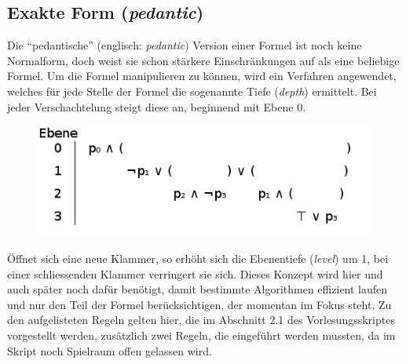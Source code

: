 \documentclass[11pt,a4paper,ngerman]{scrreprt}
\begin{document}
\subsection{Exakte Form (\textit{pedantic})}
\label{section:pedantic}
Die ``pedantische'' (englisch: \textit{pedantic}) Version einer Formel ist noch keine Normalform, doch weist sie schon stärkere Einschränkungen auf als eine beliebige Formel. Um die Formel manipulieren zu können, wird ein Verfahren angewendet, welches für jede Stelle der Formel die sogenannte Tiefe (\textit{depth}) ermittelt. Bei jeder Verschachtelung steigt diese an, beginnend mit Ebene 0.
\begin{figure}[ht]
\centering
\includegraphics[width=.7\linewidth]{pics/levels}
\end{figure}
Öffnet sich eine neue Klammer, so erhöht sich die Ebenentiefe (\textit{level}) um 1, bei einer schliessenden Klammer verringert sie sich. Dieses Konzept wird hier und auch später noch dafür benötigt, damit bestimmte Algorithmen effizient laufen und nur den Teil der Formel berücksichtigen, der momentan im Fokus steht.
Zu den aufgelisteten Regeln gelten hier, die im Abschnitt 2.1 des Vorlesungsskriptes vorgestellt werden, zusätzlich zwei Regeln, die eingeführt werden mussten, da im Skript noch Spielraum offen gelassen wird.
\end{document}
